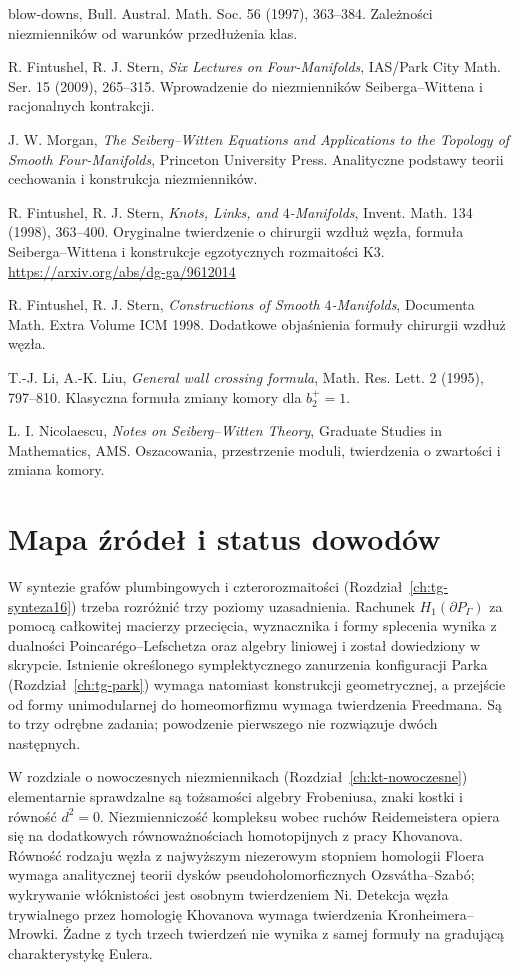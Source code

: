 \begin{enumerate}[label={[\arabic*]},leftmargin=*,itemsep=3pt]
{blow-downs}, Bull. Austral. Math. Soc. 56 (1997), 363--384.
Zależności niezmienników od warunków przedłużenia klas.
\item R. Fintushel, R. J. Stern, \emph{Six Lectures on Four-Manifolds},
IAS/Park City Math. Ser. 15 (2009), 265--315.
Wprowadzenie do niezmienników Seiberga--Wittena i racjonalnych kontrakcji.
\item J. W. Morgan, \emph{The Seiberg--Witten Equations and Applications
to the Topology of Smooth Four-Manifolds}, Princeton University Press.
Analityczne podstawy teorii cechowania i konstrukcja niezmienników.
\item R. Fintushel, R. J. Stern, \emph{Knots, Links, and
$4$-Manifolds}, Invent. Math. 134 (1998), 363--400.
Oryginalne twierdzenie o chirurgii wzdłuż węzła, formuła
Seiberga--Wittena i konstrukcje egzotycznych rozmaitości K3.
\url{https://arxiv.org/abs/dg-ga/9612014}
\item R. Fintushel, R. J. Stern, \emph{Constructions of Smooth
$4$-Manifolds}, Documenta Math. Extra Volume ICM 1998.
Dodatkowe objaśnienia formuły chirurgii wzdłuż węzła.
\item T.-J. Li, A.-K. Liu, \emph{General wall crossing formula},
Math. Res. Lett. 2 (1995), 797--810.
Klasyczna formuła zmiany komory dla $b_2^+=1$.
\item L. I. Nicolaescu, \emph{Notes on Seiberg--Witten Theory},
Graduate Studies in Mathematics, AMS. Oszacowania,
przestrzenie moduli, twierdzenia o zwartości i zmiana komory.
\end{enumerate}

\section{Mapa źródeł i status dowodów}
\label{sec:kt-bibliografia-mapa}

W syntezie grafów plumbingowych i czterorozmaitości
(Rozdział~\ref{ch:tg-synteza16}) trzeba rozróżnić
trzy poziomy uzasadnienia. Rachunek
$H_1(\partial P_\Gamma)$ za pomocą całkowitej
macierzy przecięcia, wyznacznika i
formy splecenia wynika z dualności
Poincarégo--Lefschetza oraz algebry
liniowej i został dowiedziony w skrypcie.
Istnienie określonego symplektycznego
zanurzenia konfiguracji Parka
(Rozdział~\ref{ch:tg-park})
wymaga natomiast konstrukcji geometrycznej,
a przejście od formy unimodularnej do
homeomorfizmu wymaga twierdzenia Freedmana.
Są to trzy odrębne zadania;
powodzenie pierwszego nie rozwiązuje dwóch następnych.

W rozdziale o nowoczesnych niezmiennikach
(Rozdział~\ref{ch:kt-nowoczesne})
elementarnie sprawdzalne są tożsamości
algebry Frobeniusa, znaki kostki
i równość $d^2=0$.
Niezmienniczość kompleksu wobec ruchów
Reidemeistera opiera się na dodatkowych
równoważnościach homotopijnych z pracy Khovanova.
Równość rodzaju węzła z najwyższym
niezerowym stopniem homologii Floera
wymaga analitycznej teorii dysków
pseudoholomorficznych Ozsvátha--Szabó;
wykrywanie włóknistości jest
osobnym twierdzeniem Ni.
Detekcja węzła trywialnego
przez homologię Khovanova wymaga
twierdzenia Kronheimera--Mrowki.
Żadne z tych trzech twierdzeń
nie wynika z samej formuły
na gradującą charakterystykę Eulera.

